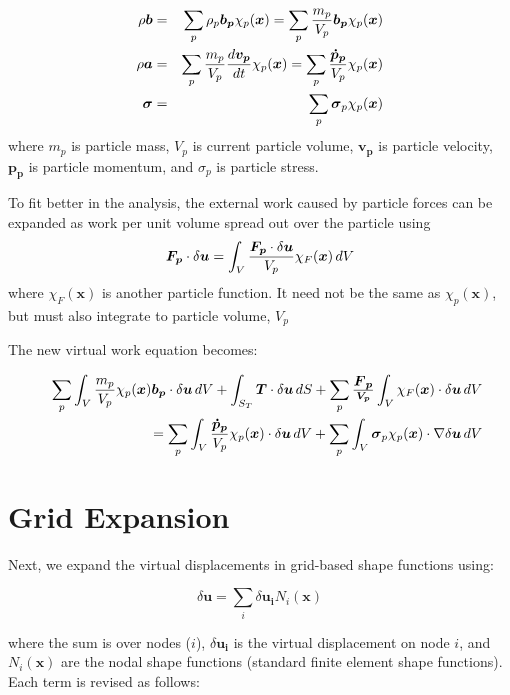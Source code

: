 \documentclass[11pt]{article}
\renewcommand{\vec}[1]{\boldsymbol{#1}}
\newcommand{\tens}[1]{\boldsymbol{\mathsf{#1}}}
\begin{document}
\begin{eqnarray}
    \rho\vec b & = & \sum_p \rho_p \vec{b_p} \chi_p(\vec x) = \sum_p {m_p\over V_p} \vec{b_p}\chi_p(\vec x) \\
    \rho\vec a & = & \sum_p {m_p\over V_p} {d\vec{v_p}\over dt} \chi_p(\vec x) = \sum_p {\vec{\dot p_p}\over V_p} \chi_p(\vec x) \\
    \tens\sigma & = & \sum_p\tens\sigma_p \chi_p(\vec x)
\end{eqnarray}
where $m_p$ is particle mass, $V_p$ is current particle volume, $\vec{v_p}$ is particle velocity, $\vec{p_p}$ is particle momentum, and $\tens\sigma_p$ is particle stress.

To fit better in the analysis, the external work caused by particle forces can be expanded as work per unit volume spread out over the particle using
\begin{equation}
    \vec {F_p} \cdot \delta\vec u =  \int_V {\vec {F_p} \cdot \delta\vec u\over V_p}\chi_F(\vec x)\thinspace dV
\end{equation}
where $\chi_F(\vec x)$ is another particle function. It need not be the same as $\chi_p(\vec x)$, but must also integrate to particle volume, $V_p$

The new virtual work equation becomes:

\begin{eqnarray}
&&\sum_p \int_V {m_p\over V_p} \chi_p(\vec x)\vec{b_p}\cdot \delta\vec u\thinspace dV + \int_{S_T}\vec T \cdot \delta\vec u \thinspace dS + \sum_p \vec {\vec F_p\over V_p} \int_V \chi_F(\vec x) \cdot \delta\vec u\thinspace dV \\
    &&\qquad\qquad
    = \sum_p\int_V {\vec{\dot p_p}\over V_p} \chi_p(\vec x)\cdot \delta\vec u\thinspace dV +  \sum_p\int_V \tens\sigma_p \chi_p(\vec x) \cdot \nabla \delta\vec u\thinspace dV
\end{eqnarray}

\section{Grid Expansion\label{gridexpand}}

Next, we expand the virtual displacements in grid-based shape functions using:

\begin{equation}
     \delta\vec u = \sum_i \delta\vec{u_i} N_i(\vec x)
\end{equation}

\noindent where the sum is over nodes ($i$), $\delta\vec{u_i}$ is the virtual displacement on node $i$, and $N_i(\vec x)$ are the nodal shape functions (standard finite element shape functions). Each term is revised as follows:
\end{document}
